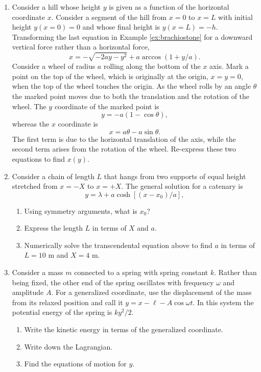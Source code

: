 \begin{enumerate}

\item Consider a hill whose height $y$ is given as a function of the
  horizontal coordinate $x$. Consider a segment of the hill from $x=0$
  to $x=L$ with initial height $y(x=0)=0$ and whose final height is
  $y(x=L)=-h$. Transforming the last equation in Example
  \ref{ex:brachiostone} for a downward vertical force rather than a
  horizontal force,
\[
x=-\sqrt{-2ay-y^2}+a\arccos(1+y/a).
\]
Consider a wheel of radius $a$ rolling along the bottom of the $x$
axis. Mark a point on the top of the wheel, which is originally at the
origin, $x=y=0$, when the top of the wheel touches the origin. As the
wheel rolls by an angle $\theta$ the marked point moves due to both
the translation and the rotation of the wheel. The $y$ coordinate of
the marked point is
\[
y=-a(1-\cos\theta),
\]
whereas the $x$ coordinate is
\[
x=a\theta-a\sin\theta.
\]
The first term is due to the horizontal translation of the axis, while
the second term arises from the rotation of the wheel. Re-express
these two equations to find $x(y)$.

\item Consider a chain of length $L$ that hangs from two supports of
  equal height stretched from $x=-X$ to $x=+X$. The general solution
  for a catenary is
\[
y=\lambda+a\cosh[(x-x_0)/a],
\]
\begin{enumerate}
\item Using symmetry arguments, what is $x_0$?
\item Express the length $L$ in terms of $X$ and $a$.
\item Numerically solve the transcendental equation above to find $a$
  in terms of $L=10$ m and $X=4$ m.
\end{enumerate}

\item Consider a mass $m$ connected to a spring with spring constant
  $k$. Rather than being fixed, the other end of the spring oscillates
  with frequency $\omega$ and amplitude $A$. For a generalized
  coordinate, use the displacement of the mass from its relaxed
  position and call it $y=x-\ell-A\cos\omega t$. In this system the
  potential energy of the spring is $ky^2/2$.
\begin{enumerate}
\item Write the kinetic energy in terms of the generalized coordinate.
\item Write down the Lagrangian.
\item Find the equations of motion for $y$.
\end{enumerate}


\end{enumerate}
